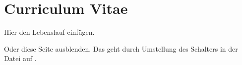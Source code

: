 \chapter*{Curriculum Vitae}
%
%
%
%
%
Hier den Lebenslauf einfügen.

Oder diese Seite ausblenden.
Das geht durch Umstellung des Schalters
in der Datei 
auf .